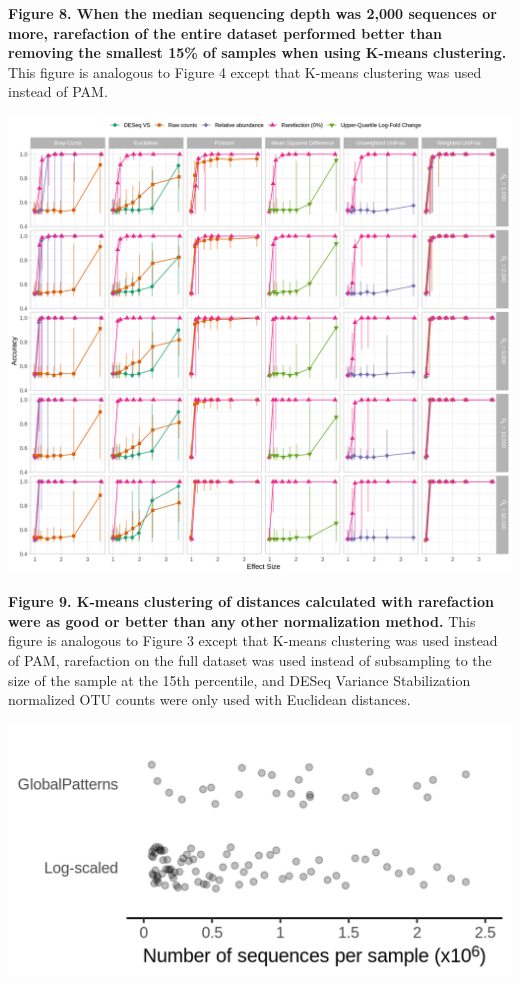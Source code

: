 \documentclass[
]{article}
\begin{document}
\textbf{Figure 8. When the median sequencing depth was 2,000 sequences
or more, rarefaction of the entire dataset performed better than
removing the smallest 15\% of samples when using K-means clustering.}
This figure is analogous to Figure 4 except that K-means clustering was
used instead of PAM.

\newpage

\includegraphics{figure_09.png}

\textbf{Figure 9. K-means clustering of distances calculated with
rarefaction were as good or better than any other normalization method.}
This figure is analogous to Figure 3 except that K-means clustering was
used instead of PAM, rarefaction on the full dataset was used instead of
subsampling to the size of the sample at the 15th percentile, and DESeq
Variance Stabilization normalized OTU counts were only used with
Euclidean distances.

\newpage

\includegraphics{figure_10.png}
\end{document}
